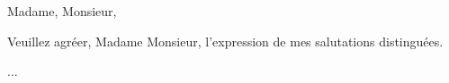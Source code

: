 \documentclass[11pt,a4paper]{moderncv}
\begin{document}
\date{\today}
\opening{Madame, Monsieur,}
\closing{Veuillez agréer, Madame Monsieur, l'expression de mes salutations distinguées.}
\makelettertitle

...

\bigskip

\makeletterclosing
\end{document}
